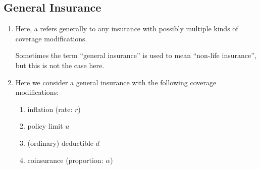 \subsection{General Insurance}
\begin{enumerate}
\item Here, a  refers generally to any insurance with
possibly multiple kinds of coverage modifications.

\begin{note}
Sometimes the term ``general insurance'' is used to mean ``non-life
insurance'', but this is not the case here.
\end{note}

\item Here we consider a general insurance with the following coverage
modifications:
\begin{enumerate}
\item inflation (rate: \(r\))
\item policy limit \(u\)
\item (ordinary) deductible \(d\)
\item coinsurance (proportion: \(\alpha\))
\end{enumerate}


\end{enumerate}
